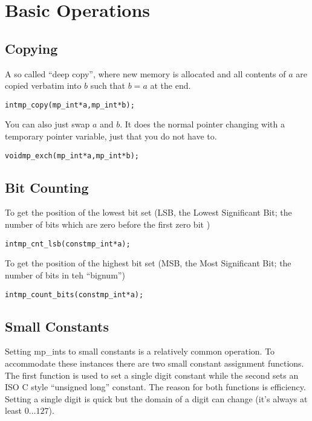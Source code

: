 \documentclass[synpaper]{book}
\begin{document}
\chapter{Basic Operations}
\section{Copying}

A so called ``deep copy'', where new memory is allocated and all contents of $a$ are copied verbatim into $b$ such that $b = a$ at the end.

\begin{alltt}
int mp_copy (mp_int * a, mp_int *b);
\end{alltt}

You can also just swap $a$ and $b$. It does the normal pointer changing with a temporary pointer variable, just that you do not have to.

\begin{alltt}
void mp_exch (mp_int * a, mp_int *b);
\end{alltt}

\section{Bit Counting}

To get the position of the lowest bit set (LSB, the Lowest Significant Bit; the number of bits which are zero before the first zero bit )

\begin{alltt}
int mp_cnt_lsb(const mp_int *a);
\end{alltt}

To get the position of the highest bit set (MSB, the Most Significant Bit; the number of bits in teh ``bignum'')

\begin{alltt}
int mp_count_bits(const mp_int *a);
\end{alltt}


\section{Small Constants}
Setting mp\_ints to small constants is a relatively common operation.  To accommodate these instances there are two
small constant assignment functions.  The first function is used to set a single digit constant while the second sets
an ISO C style ``unsigned long'' constant.  The reason for both functions is efficiency.  Setting a single digit is quick but the
domain of a digit can change (it's always at least $0 \ldots 127$).
\end{document}
